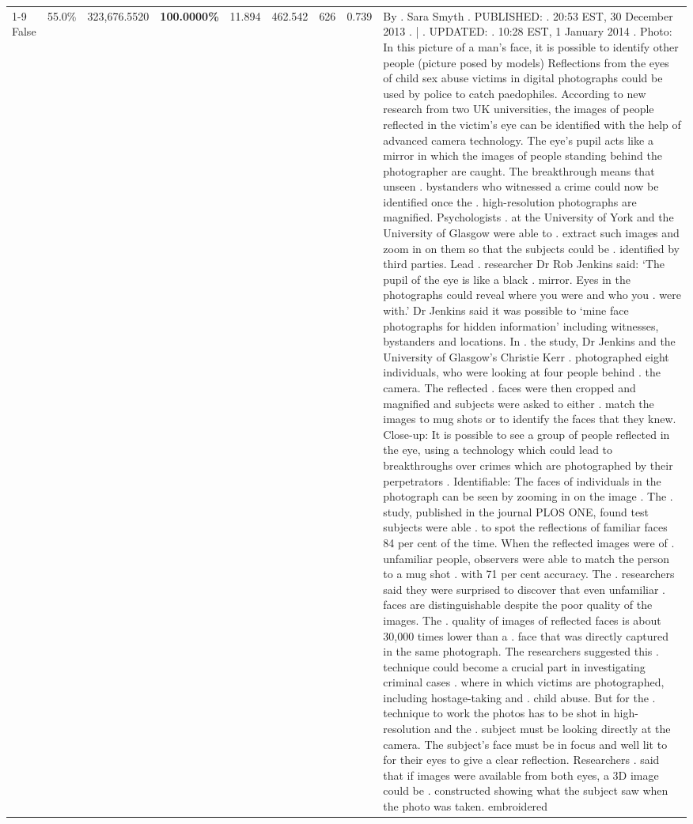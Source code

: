 \begin{table}[H]
\begin{tabular}{lllrlllll}
\cline{1-9}
False & 55.0\% & 323,676.5520 & \bfseries \color{red} 100.0000\% & 11.894 & 462.542 & 626 & 0.739 & By . Sara Smyth . PUBLISHED: . 20:53 EST, 30 December 2013 . | . UPDATED: . 10:28 EST, 1 January 2014 . Photo: In this picture of a man's face, it is possible to identify other people (picture posed by models) Reflections from the eyes of child sex abuse victims in digital photographs could be used by police to catch paedophiles. According to new research from two UK universities, the images of people reflected in the victim's eye can be identified with the help of advanced camera technology. The eye's pupil acts like a mirror in which the images of people standing behind the photographer are caught. The breakthrough means that unseen . bystanders who witnessed a crime could now be identified once the . high-resolution photographs are magnified. Psychologists . at the University of York and the University of Glasgow were able to . extract such images and zoom in on them so that the subjects could be . identified by third parties. Lead . researcher Dr Rob Jenkins said: ‘The pupil of the eye is like a black . mirror. Eyes in the photographs could reveal where you were and who you . were with.' Dr Jenkins said it was possible to ‘mine face photographs for hidden information' including witnesses, bystanders and locations. In . the study, Dr Jenkins and the University of Glasgow's Christie Kerr . photographed eight individuals, who were looking at four people behind . the camera. The reflected . faces were then cropped and magnified and subjects were asked to either . match the images to mug shots or to identify the faces that they knew. Close-up: It is possible to see a group of people reflected in the eye, using a technology which could lead to breakthroughs over crimes which are photographed by their perpetrators . Identifiable: The faces of individuals in the photograph can be seen by zooming in on the image . The . study, published in the journal PLOS ONE, found test subjects were able . to spot the reflections of familiar faces 84 per cent of the time. When the reflected images were of . unfamiliar people, observers were able to match the person to a mug shot . with 71 per cent accuracy. The . researchers said they were surprised to discover that even unfamiliar . faces are distinguishable despite the poor quality of the images. The . quality of images of reflected faces is about 30,000 times lower than a . face that was directly captured in the same photograph. The researchers suggested this . technique could become a crucial part in investigating criminal cases . where in which victims are photographed, including hostage-taking and . child abuse. But for the . technique to work the photos has to be shot in high-resolution and the . subject must be looking directly at the camera. The subject's face must be in focus and well lit to for their eyes to give a clear reflection. Researchers . said that if images were available from both eyes, a 3D image could be . constructed showing what the subject saw when the photo was taken. embroidered \\

\end{tabular}
\end{table}
